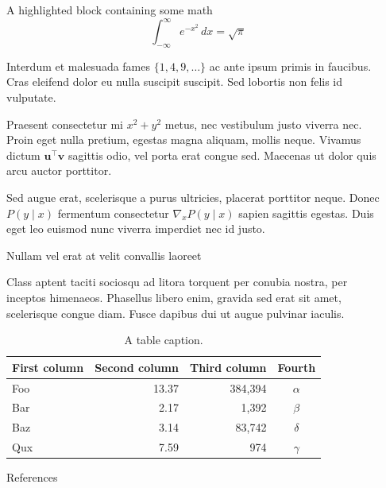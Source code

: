 \documentclass[final]{beamer}
\newlength{\sepwidth}
\newlength{\colwidth}
\newcommand{\separatorcolumn}{\begin{column}{\sepwidth}\end{column}}
\begin{document}
\begin{frame}[t]
\begin{columns}[t]
\begin{column}{\colwidth}
\begin{exampleblock}{A highlighted block containing some math}
    $$
    \int_{-\infty}^{\infty} e^{-x^2}\,dx = \sqrt{\pi}
    $$

    Interdum et malesuada fames $\{1, 4, 9, \ldots\}$ ac ante ipsum primis in
    faucibus. Cras eleifend dolor eu nulla suscipit suscipit. Sed lobortis non
    felis id vulputate.


    Praesent consectetur mi $x^2 + y^2$ metus, nec vestibulum justo viverra
    nec. Proin eget nulla pretium, egestas magna aliquam, mollis neque. Vivamus
    dictum $\mathbf{u}^\intercal\mathbf{v}$ sagittis odio, vel porta erat
    congue sed. Maecenas ut dolor quis arcu auctor porttitor.


    Sed augue erat, scelerisque a purus ultricies, placerat porttitor neque.
    Donec $P(y \mid x)$ fermentum consectetur $\nabla_x P(y \mid x)$ sapien
    sagittis egestas. Duis eget leo euismod nunc viverra imperdiet nec id
    justo.

  \end{exampleblock}

  \begin{block}{Nullam vel erat at velit convallis laoreet}

    Class aptent taciti sociosqu ad litora torquent per conubia nostra, per
    inceptos himenaeos. Phasellus libero enim, gravida sed erat sit amet,
    scelerisque congue diam. Fusce dapibus dui ut augue pulvinar iaculis.

    \begin{table}
      \centering
      \begin{tabular}{l r r c}
        \toprule
        \textbf{First column} & \textbf{Second column} & \textbf{Third column} & \textbf{Fourth} \\
        \midrule
        Foo & 13.37 & 384,394 & $\alpha$ \\
        Bar & 2.17 & 1,392 & $\beta$ \\
        Baz & 3.14 & 83,742 & $\delta$ \\
        Qux & 7.59 & 974 & $\gamma$ \\
        \bottomrule
      \end{tabular}
      \caption{A table caption.}
    \end{table}

  \end{block}

  \begin{block}{References}
   \nocite{*}
   \footnotesize{}

  \end{block}

\end{column}

\separatorcolumn
\end{columns}
\end{frame}
\end{document}
